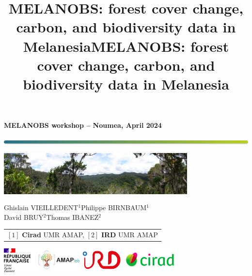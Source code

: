 \documentclass[10pt,table,dvipsnames,compress]{beamer}
\date{}
\title{MELANOBS: forest cover change, carbon, and biodiversity data in Melanesia}
\title[MELANOBS]{MELANOBS: forest cover change, carbon, and biodiversity data in Melanesia}
\begin{document}

{
  \begin{frame}
  \begin{center}
  \small{\textbf{MELANOBS workshop -- Noumea, April 2024}}
  \end{center}
  \vspace{-0.5cm}
  \titlepage %
  \vspace{-3cm}
  \begin{center}
    \includegraphics[width=\textwidth]{figs/Barre_couleur}
    
    \vspace{0.25cm}
    
    \includegraphics[width=10cm]{figs/Banniere}
    
    \small{Ghislain VIEILLEDENT$^{1}$\hspace{0.25cm}Philippe BIRNBAUM$^{1}$\\
      \vspace{0.10cm}David BRUY$^{2}$\hspace{0.25cm}Thomas IBANEZ$^{2}$}
      
    \vspace{0.25cm}
    
    {\scriptsize
      \begin{tabular}{l}
        $[1]$ \textbf{Cirad} UMR AMAP, $[2]$ \textbf{IRD} UMR AMAP
      \end{tabular}
    }
    
    \includegraphics[width=0.7\textwidth]{figs/partners_logos}
    
  \end{center}
  \end{frame}
}
\end{document}
